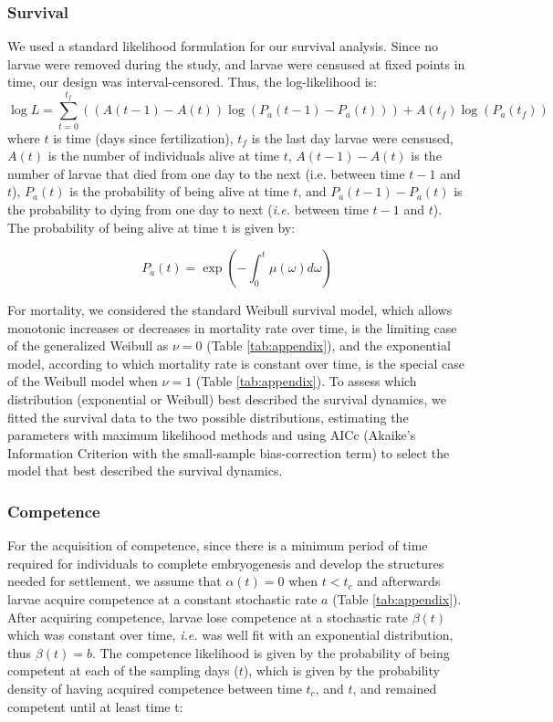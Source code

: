 \documentclass[preprint,12pt,authoryear]{elsarticle}
\begin{document}
	\subsubsection{Survival}
	We used a standard likelihood formulation for our survival analysis. Since no larvae were removed during the study, and larvae were censused at fixed points in time, our design was interval-censored. Thus, the log-likelihood is:
	\begin{equation}
		\log L = \sum_{t=0}^{t_f} \left((A(t-1)-A(t))\log(P_a(t-1)-P_a(t))\right) + A(t_f)\log(P_a(t_f))
	\end{equation}
	where $t$ is time (days since fertilization), $t_f$ is the last day larvae were censused, $A(t)$ is the number of individuals alive at time $t$, $A(t-1)-A(t)$ is the number of larvae that died from one day to the next (i.e. between time $t-1$ and $t$),  $P_a(t)$ is the probability of being alive at time $t$, and $P_a(t-1)-P_a(t)$ is the probability to dying from one day to next (\textit{i.e.} between time $t-1$ and $t$). The probability of being alive at time t is given by:

	\begin{equation}
		P_a(t) = \exp\left(-\int_0^t\mu(\omega)d\omega\right)
	\end{equation}

	For mortality, we considered the standard Weibull survival model, which allows monotonic increases or decreases in mortality rate over time, is the limiting case of the generalized Weibull as $\nu = 0$ (Table \ref{tab:appendix}), and the exponential model, according to which mortality rate is constant over time, is the special case of the Weibull model when $\nu=1$ (Table \ref{tab:appendix}). To assess which distribution (exponential or Weibull) best described the survival dynamics, we fitted the survival data to the two possible distributions, estimating the parameters with maximum likelihood methods and using AICc (Akaike’s Information Criterion with the small-sample bias-correction term) to select the model that best described the survival dynamics. 
	\subsubsection{Competence}
	For the acquisition of competence, since there is a minimum period of time required for individuals to complete embryogenesis and develop the structures needed for settlement, we assume that $\alpha(t) = 0$ when $t < t_c$  and afterwards larvae acquire competence at a constant stochastic rate $a$ (Table \ref{tab:appendix}). After acquiring competence, larvae lose competence at a stochastic rate $\beta(t)$ which was constant over time, \textit{i.e.} was well fit with an exponential distribution, thus $\beta(t) =b$. The competence likelihood is given by the probability of being competent at each of the sampling days ($t$), which is given by the probability density of having acquired competence between time $t_c$, and $t$, and remained competent until at least time t:
\end{document}
